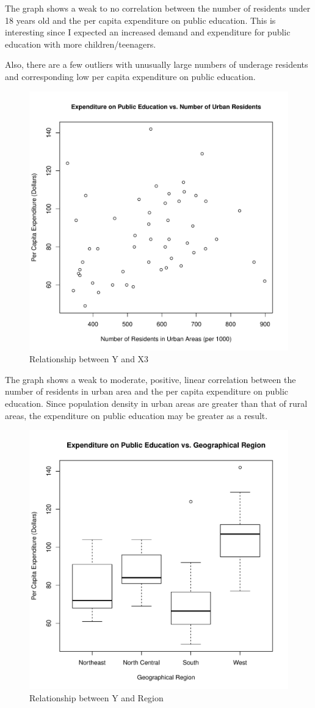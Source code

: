\documentclass[12pt,letterpaper]{article}
\begin{document}
\begin{itemize}
\noindent The graph shows a weak to no correlation between the number of residents under 18 years old and the per capita expenditure on public education. This is interesting since I expected an increased demand and expenditure for public education with more children/teenagers. 

\vspace{0.5cm}

\noindent Also, there are a few outliers with unusually large numbers of underage residents and corresponding low per capita expenditure on public education.

\newpage
\begin{figure} [h]
	\centering
	\includegraphics[width=0.7\linewidth]{Graph2}
	\caption{Relationship between Y and X3}
	\label{fig:graph3}
\end{figure}

The graph shows a weak to moderate, positive, linear correlation between the number of residents in urban area and the per capita expenditure on public education. Since population density in urban areas are greater than that of rural areas, the expenditure on public education may be greater as a result.
\newpage 
\begin{figure} [h]
	\centering
	\includegraphics[width=0.7\linewidth]{Graph3}
	\caption{Relationship between Y and Region}
	\label{fig:graph2}
\end{figure}


\end{itemize}
\end{document}
